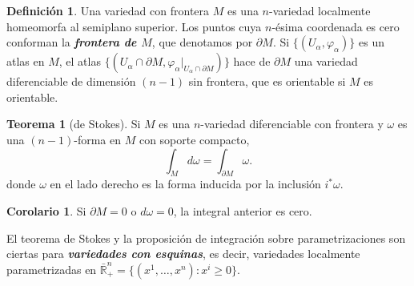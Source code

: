 \documentclass[spanish]{article}
\theoremstyle{definition}
\newtheorem*{defn}{Definición}
\newtheorem*{teo}{Teorema}
\newtheorem*{coro}{Corolario}
\newcommand{\R}{\mathbb{R}}
\begin{document}
	\begin{defn}
		Una variedad con frontera $M$ es una $n$-variedad localmente homeomorfa al semiplano superior. Los puntos cuya $n$-ésima coordenada es cero conforman la \textbf{\textit{frontera de $M$}}, que denotamos por $\partial M$. Si $\{(U_\alpha,\varphi_\alpha)\}$ es un atlas en $M$, el atlas $\{(U_\alpha\cap\partial M,\varphi_{\alpha}|_{U_\alpha\cap\partial M})\}$ hace de $\partial M$ una variedad diferenciable de dimensión $(n-1)$ sin frontera, que es orientable si $M$ es orientable.
	\end{defn}
	
	\begin{teo}[de Stokes]
		Si $M$ es una $n$-variedad diferenciable con frontera y $\omega$ es una $(n-1)$-forma en $M$ con soporte compacto,
		\[\int_{M}d\omega=\int_{\partial M}\omega.\]
		donde $\omega$ en el lado derecho es la forma inducida por la inclusión $i^*\omega$.
	\end{teo}
	\begin{coro}
		Si $\partial M=0$ o $d\omega=0$, la integral anterior es cero.
	\end{coro}

		El teorema de Stokes y la proposición de integración sobre parametrizaciones son ciertas para \textbf{\textit{variedades con esquinas}}, es decir, variedades localmente parametrizadas en $\bar{\R}^n_+=\{(x^1,\ldots,x^n):x^i\geq0\}$.
\end{document}
